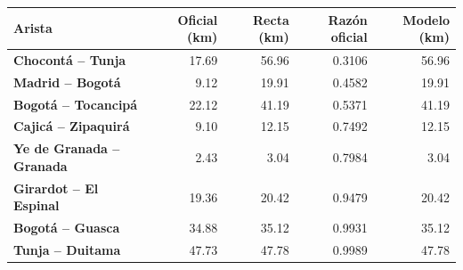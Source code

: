 \renewcommand{\arraystretch}{1.2}
\begin{tabular}{|l|r|r|r|r|}
\hline
\rowcolor{gray!20} \textbf{Arista} & \textbf{Oficial (km)} & \textbf{Recta (km)} & \textbf{Razón oficial} & \textbf{Modelo (km)} \\
\hline
\textbf{Chocontá -- Tunja} & 17.69 & 56.96 & 0.3106 & 56.96 \\
\hline
\textbf{Madrid -- Bogotá} & 9.12 & 19.91 & 0.4582 & 19.91 \\
\hline
\textbf{Bogotá -- Tocancipá} & 22.12 & 41.19 & 0.5371 & 41.19 \\
\hline
\textbf{Cajicá -- Zipaquirá} & 9.10 & 12.15 & 0.7492 & 12.15 \\
\hline
\textbf{Ye de Granada -- Granada} & 2.43 & 3.04 & 0.7984 & 3.04 \\
\hline
\textbf{Girardot -- El Espinal} & 19.36 & 20.42 & 0.9479 & 20.42 \\
\hline
\textbf{Bogotá -- Guasca} & 34.88 & 35.12 & 0.9931 & 35.12 \\
\hline
\textbf{Tunja -- Duitama} & 47.73 & 47.78 & 0.9989 & 47.78 \\
\hline
\end{tabular}

